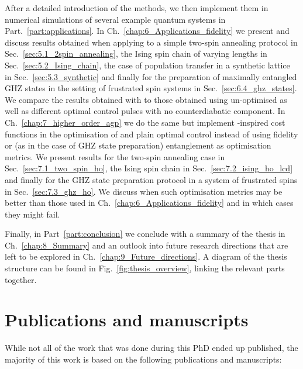 After a detailed introduction of the methods, we then implement them in numerical simulations of several example quantum systems in Part.~\ref{part:applications}. In Ch.~\ref{chap:6_Applications_fidelity} we present and discuss results obtained when applying  to a simple two-spin annealing protocol in Sec.~\ref{sec:5.1_2spin_annealing}, the Ising spin chain of varying lengths in Sec.~\ref{sec:5.2_Ising_chain}, the case of population transfer in a synthetic lattice in Sec.~\ref{sec:5.3_synthetic} and finally for the preparation of maximally entangled GHZ states in the setting of frustrated spin systems in Sec.~\ref{sec:6.4_ghz_states}. We compare the results obtained with  to those obtained using un-optimised  as well as different optimal control pulses with no counterdiabatic component. In Ch.~\ref{chap:7_higher_order_agp} we do the same but implement -inspired cost functions in the optimisation of  and plain optimal control instead of using fidelity or (as in the case of GHZ state preparation) entanglement as optimisation metrics. We present results for the two-spin annealing case in Sec.~\ref{sec:7.1_two_spin_ho}, the Ising spin chain in Sec.~\ref{sec:7.2_ising_ho_lcd} and finally for the GHZ state preparation protocol in a system of frustrated spins in Sec.~\ref{sec:7.3_ghz_ho}. We discuss when such optimisation metrics may be better than those used in Ch.~\ref{chap:6_Applications_fidelity} and in which cases they might fail.

Finally, in Part~\ref{part:conclusion} we conclude with a summary of the thesis in Ch.~\ref{chap:8_Summary} and an outlook into future research directions that are left to be explored in Ch.~\ref{chap:9_Future_directions}. A diagram of the thesis structure can be found in Fig.~\ref{fig:thesis_overview}, linking the relevant parts together.

\section{Publications and manuscripts}

While not all of the work that was done during this PhD ended up published, the majority of this work is based on the following publications and manuscripts:

